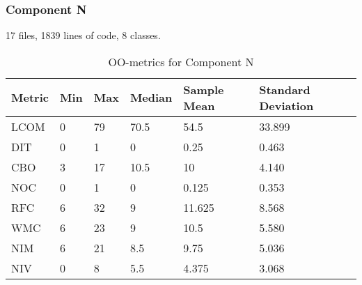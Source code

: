 \subsubsection{Component N}
17 files, 1839 lines of code, 8 classes.
\begin{table}[]
\centering
\caption{OO-metrics for Component N}
\label{tab:oometrics-netw}
\begin{tabular}{|l|l|l|l|l|l|}
\hline
\textbf{Metric} & \textbf{Min} & \textbf{Max} & \textbf{Median} & \textbf{Sample Mean} & \textbf{Standard Deviation} \\ \hline
LCOM            & 0            & 79           & 70.5            & 54.5                 & 33.899                      \\ \hline
DIT             & 0            & 1            & 0               & 0.25                 & 0.463                       \\ \hline
CBO             & 3            & 17           & 10.5            & 10                   & 4.140                       \\ \hline
NOC             & 0            & 1            & 0               & 0.125                & 0.353                       \\ \hline
RFC             & 6            & 32           & 9               & 11.625               & 8.568                       \\ \hline
WMC             & 6            & 23           & 9               & 10.5                 & 5.580                       \\ \hline
NIM             & 6            & 21           & 8.5             & 9.75                 & 5.036                       \\ \hline
NIV             & 0            & 8            & 5.5             & 4.375                & 3.068                       \\ \hline
\end{tabular}
\end{table}




